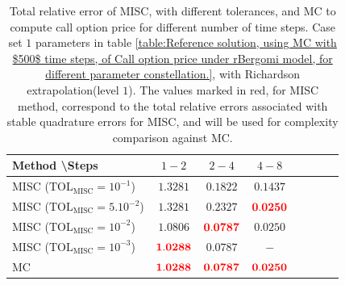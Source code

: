 \begin{table}[h!]
	\centering
	\begin{tabular}{l*{6}{c}r}
		Method \textbackslash  Steps            & $1-2$ & $2-4$ & $4-8$  \\
		\hline
		MISC ($\text{TOL}_{\text{MISC}}=10^{-1}$)  & $\mathbf{  1.3281}$ & $\mathbf{0.1822}$ & $\mathbf{0.1437}$   \\
		MISC ($\text{TOL}_{\text{MISC}}=5.10^{-2}$)  & $\mathbf{  1.3281}$ & $\mathbf{ 0.2327}$ & $\mathbf{  {\color{red}0.0250}}$   \\
		MISC ($\text{TOL}_{\text{MISC}}=10^{-2}$)  & $\mathbf{   1.0806
		}$ & $\mathbf{    {\color{red}0.0787}}$ & $\mathbf{ 0.0250}$  \\
		MISC ($\text{TOL}_{\text{MISC}}=10^{-3}$)  & $\mathbf{ {\color{red}  1.0288}}$ & $\mathbf{    0.0787}$ & $\mathbf{-}$  \\
		

		\hline
		
		MC &$\mathbf{ {\color{red}  1.0288}}$  & $\mathbf{{\color{red}0.0787}}$ & $\mathbf{{\color{red}0.0250}}$  \\
		
		\hline
	\end{tabular}
	\caption{Total relative error of MISC, with different tolerances,  and MC to compute call option price  for different number of time steps. Case set $1$ parameters in table \ref{table:Reference solution, using MC with $500$ time steps, of Call option price under rBergomi model, for different parameter constellation.}, with Richardson extrapolation(level $1$). The values marked in red, for MISC method, correspond to the total relative errors associated with  stable quadrature errors for MISC, and will be used for complexity comparison against MC.}
	\label{Total  error of MISC and MC to compute Call option price of the different tolerances for different number of time steps. Case set $2$ parameters, with Richardson extrapolation(level $1$). The numbers between parentheses are the corresponding absolute errors,relative}
\end{table}


